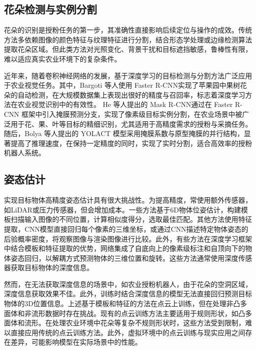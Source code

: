\subsection{花朵检测与实例分割} 
花朵的识别是授粉任务的第一步，其准确性直接影响后续定位与操作的成效。传统方法多依赖图像的颜色特征\cite{chen2008fast}与纹理特征\cite{ojala1999unsupervised}进行分割，结合形态学处理\cite{maragos1987tutorial}或边缘检测算法\cite{peli1982study}提取花朵区域。但此类方法对光照变化、背景干扰和目标遮挡敏感，鲁棒性有限，难以适应真实农业环境下的复杂条件。

近年来，随着卷积神经网络的发展，基于深度学习的目标检测与分割方法广泛应用于农业视觉任务。其中，Bargoti 等人\cite{bargoti2017deep}使用 Faster R-CNN\cite{girshick2015fast}实现了苹果园中果树花朵的自动检测，在大规模数据集上表现出很好的精度与召回率，标志着深度学习方法在农业视觉识别中的有效性。
He 等人提出的 Mask R-CNN\cite{he2017mask}通过在 Faster R-CNN 框架中引入掩膜预测分支，实现了像素级目标实例分割，在农业场景中被广泛用于花、果、叶等目标的精细识别，尤其适用于高精度需求的授粉与采摘任务。随后，Bolya 等人提出的 YOLACT\cite{bolya2019yolact} 模型采用掩膜系数与原型掩膜的并行结构，显著提高了推理速度，在保持一定精度的同时，实现了实时分割，适合高效率的授粉机器人系统。
\subsection{姿态估计}
实现目标物体高精度姿态估计具有很大挑战性。为提高精度，常使用额外传感器，如LiDAR或压力传感器，但会增加成本。一些方法基于6D物体位姿估计\cite{brachmann2014learning}，构建模板扫描输入图像的不同位置，计算相似度得分，选取最佳匹配\cite{hinterstoisser2011gradient,cao2016real}。其他方法使用特征提取，CNN模型直接回归每个像素的三维坐标\cite{brachmann2014learning}，或通过CNN描述特定物体姿态的后验概率密度\cite{krull2015learning}，将观察图像与渲染图像进行比较。此外，有些方法在深度学习框架中结合模板和特征提取的优势，网络集成了自底向上的像素级标注和自顶向下的物体姿态回归\cite{xiang2017posecnn}，以解耦方式预测物体的三维位置和旋转。这些方法通常使用深度传感器获取目标物体的深度信息。

然而，在无法获取深度信息的场景中，如农业授粉机器人，由于花朵的空洞区域，深度信息获取效果不佳。此外，训练时结合深度信息的模型无法直接回归预测目标物体的3D位置信息。上述基于模板和特征的方法在点云上训练，但在处理非凸多面体和非流形数据时存在挑战。现有的点云训练方法主要适用于规则形状，如凸多面体和流形。在处理农业环境中花朵等复杂不规则形状时，这些方法受到限制，难以直接应用传统的点云训练方法。此外，虚拟环境中的点云训练与现实应用之间存在差异，可能影响模型在实际场景中的性能。

